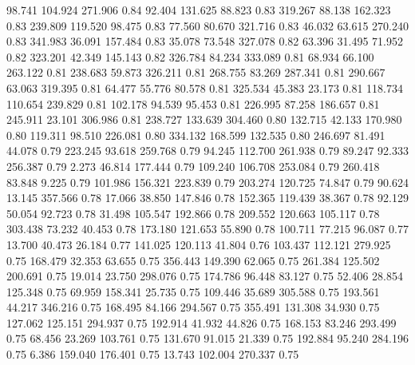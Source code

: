   98.741  104.924  271.906         0.84
  92.404  131.625   88.823         0.83
 319.267   88.138  162.323         0.83
 239.809  119.520   98.475         0.83
  77.560   80.670  321.716         0.83
  46.032   63.615  270.240         0.83
 341.983   36.091  157.484         0.83
  35.078   73.548  327.078         0.82
  63.396   31.495   71.952         0.82
 323.201   42.349  145.143         0.82
 326.784   84.234  333.089         0.81
  68.934   66.100  263.122         0.81
 238.683   59.873  326.211         0.81
 268.755   83.269  287.341         0.81
 290.667   63.063  319.395         0.81
  64.477   55.776   80.578         0.81
 325.534   45.383   23.173         0.81
 118.734  110.654  239.829         0.81
 102.178   94.539   95.453         0.81
 226.995   87.258  186.657         0.81
 245.911   23.101  306.986         0.81
 238.727  133.639  304.460         0.80
 132.715   42.133  170.980         0.80
 119.311   98.510  226.081         0.80
 334.132  168.599  132.535         0.80
 246.697   81.491   44.078         0.79
 223.245   93.618  259.768         0.79
  94.245  112.700  261.938         0.79
  89.247   92.333  256.387         0.79
   2.273   46.814  177.444         0.79
 109.240  106.708  253.084         0.79
 260.418   83.848    9.225         0.79
 101.986  156.321  223.839         0.79
 203.274  120.725   74.847         0.79
  90.624   13.145  357.566         0.78
  17.066   38.850  147.846         0.78
 152.365  119.439   38.367         0.78
  92.129   50.054   92.723         0.78
  31.498  105.547  192.866         0.78
 209.552  120.663  105.117         0.78
 303.438   73.232   40.453         0.78
 173.180  121.653   55.890         0.78
 100.711   77.215   96.087         0.77
  13.700   40.473   26.184         0.77
 141.025  120.113   41.804         0.76
 103.437  112.121  279.925         0.75
 168.479   32.353   63.655         0.75
 356.443  149.390   62.065         0.75
 261.384  125.502  200.691         0.75
  19.014   23.750  298.076         0.75
 174.786   96.448   83.127         0.75
  52.406   28.854  125.348         0.75
  69.959  158.341   25.735         0.75
 109.446   35.689  305.588         0.75
 193.561   44.217  346.216         0.75
 168.495   84.166  294.567         0.75
 355.491  131.308   34.930         0.75
 127.062  125.151  294.937         0.75
 192.914   41.932   44.826         0.75
 168.153   83.246  293.499         0.75
  68.456   23.269  103.761         0.75
 131.670   91.015   21.339         0.75
 192.884   95.240  284.196         0.75
   6.386  159.040  176.401         0.75
  13.743  102.004  270.337         0.75
